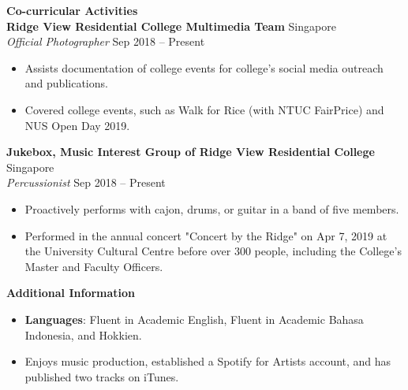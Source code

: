 \documentclass[a4paper, 11pt]{article}
\newcommand{\interspace}{\vspace{10pt}}
\newcommand{\intraspace}{\vspace{5pt}}
\begin{document}
	\interspace
	
	\textbf{\large Co-curricular Activities} \hrulefill \\
	\textbf{Ridge View Residential College Multimedia Team} \hfill Singapore\\
	\textit{Official Photographer} \hfill Sep 2018 -- Present
	\begin{itemize}[leftmargin=*, noitemsep, topsep=0pt]
		\item Assists documentation of college events for college’s social media outreach and publications.
		\item Covered college events, such as Walk for Rice (with NTUC FairPrice) and NUS Open Day 2019.
	\end{itemize}
	\intraspace
	
	\textbf{Jukebox, Music Interest Group of Ridge View Residential College} \hfill Singapore\\
	\textit{Percussionist} \hfill Sep 2018 -- Present
	\begin{itemize}[leftmargin=*, noitemsep, topsep=0pt]
		\item Proactively performs with cajon, drums, or guitar in a band of five members.
		\item Performed in the annual concert "Concert by the Ridge" on Apr 7, 2019 at the University Cultural Centre before over 300 people, including the College’s Master and Faculty Officers.
	\end{itemize}

	\interspace
	
	\textbf{\large Additional Information} \hrulefill
	\begin{itemize}[leftmargin=*, noitemsep, topsep=0pt]
		\item \textbf{Languages}: Fluent in Academic English, Fluent in Academic Bahasa Indonesia, and Hokkien.
		\item Enjoys music production, established a Spotify for Artists account, and has published two tracks on iTunes.
	\end{itemize}
\end{document}
